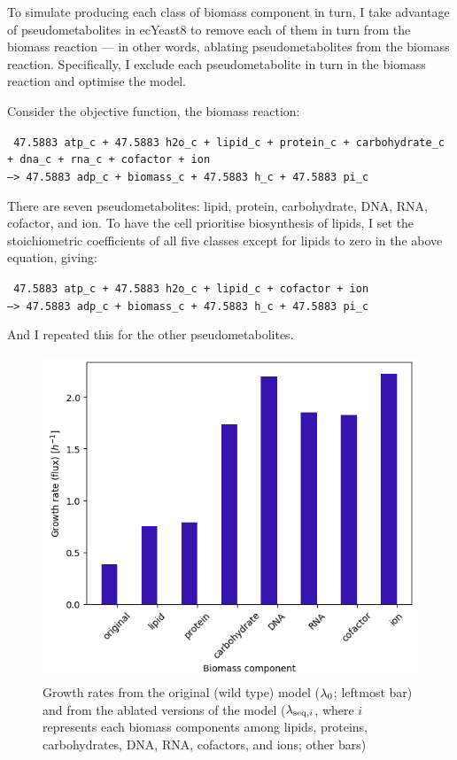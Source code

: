 To simulate producing each class of biomass component in turn,
I take advantage of pseudometabolites in ecYeast8 to remove each of them in turn from the biomass reaction ---
in other words, ablating pseudometabolites from the biomass reaction.
Specifically, I exclude each pseudometabolite in turn in the biomass reaction and optimise the model.

Consider the objective function, the biomass reaction:

\texttt{
  47.5883 atp\_c + 47.5883 h2o\_c + lipid\_c + protein\_c + carbohydrate\_c\\
  + dna\_c + rna\_c + cofactor + ion \\
  --> 47.5883 adp\_c + biomass\_c + 47.5883 h\_c + 47.5883 pi\_c
}

There are seven pseudometabolites: lipid, protein, carbohydrate, DNA, RNA, cofactor, and ion.
To have the cell prioritise biosynthesis of lipids, I set the stoichiometric coefficients of all five classes except for lipids to zero in the above equation, giving:

\texttt{
  47.5883 atp\_c + 47.5883 h2o\_c + lipid\_c + cofactor + ion \\
  --> 47.5883 adp\_c + biomass\_c + 47.5883 h\_c + 47.5883 pi\_c
}

And I repeated this for the other pseudometabolites.

\begin{figure}
  \centering
  \includegraphics[width=.6\linewidth]{ablation_example_fluxes.png}
  \caption{
    Growth rates from the original (wild type) model ($\lambda_{0}$; leftmost bar) and from the ablated versions of the model ($\lambda_{\mathrm{seq},i}$, where $i$ represents each biomass components among lipids, proteins, carbohydrates, DNA, RNA, cofactors, and ions; other bars)
  }
  \label{fig:model-ablate-fluxes}
\end{figure}


